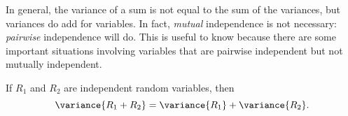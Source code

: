 In general, the variance of a sum is not equal to the sum of the
variances, but variances do add for \emph{} variables.
In fact,  \emph{mutual} independence is not
necessary:  \emph{pairwise} independence will
do.  This is useful to know because there are some important situations
involving variables that are pairwise independent but not mutually
independent.

\begin{theorem}\label{indvar}
If $R_1$ and $R_2$ are independent random variables, then
\begin{equation}\label{vR+R}
\variance{R_1 + R_2} = \variance{R_1} + \variance{R_2}.
\end{equation}
\end{theorem}

